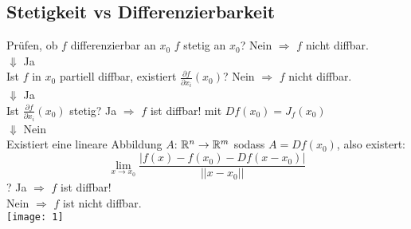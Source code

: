 \subsection{Stetigkeit vs Differenzierbarkeit}


\begin{Rezept}{Prüfen, ob $f$ differenzierbar an $x_0$}{}
	$f$ stetig an $x_0$? Nein $\Rightarrow$ $f$ nicht diffbar.\\
	$\Downarrow$ Ja\\
	Ist $f$ in $x_0$ partiell diffbar, existiert $\frac{\partial f}{\partial x_i}(x_0)$? Nein $\Rightarrow$ $f$ nicht diffbar.\\
	$\Downarrow$ Ja\\
	Ist $\frac{\partial f}{\partial x_i}(x_0)$ stetig? Ja $\Rightarrow$ $f$ ist diffbar! mit $Df(x_0) = J_f(x_0)$\\
	$\Downarrow$ Nein\\
	Existiert eine lineare Abbildung $A$: $\mathbb{R}^n \rightarrow \mathbb{R}^m$ sodass $A=Df(x_0)$, also existert:
	\[
    	\lim_{x\rightarrow x_0} \frac{|f(x)-f(x_0)-Df(x-x_0)|}{||x-x_0||}
	\]?
	Ja $\Rightarrow$ $f$ ist diffbar!\\
	Nein $\Rightarrow$ $f$ ist nicht diffbar.\\
	\texttt{[image: 1]}
\end{Rezept}

